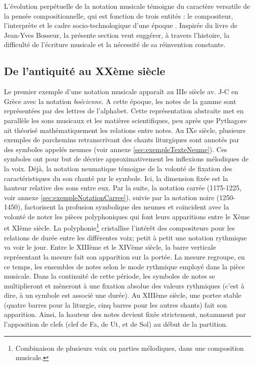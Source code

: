 L'évolution perpétuelle de la notation musicale témoigne du caractère versatile de la pensée compositionnelle, qui est fonction de trois entités : le compositeur, l'interprète et le cadre socio-technologique d'une époque \cite{bosseur2005}.
Inspirée du livre  de Jean-Yves Bosseur, la présente section %
veut suggérer, à travers l'histoire, la difficulté de l'écriture musicale et la nécessité de sa réinvention constante.


\subsection{De l'antiquité au XXème siècle}
\label{subsec:antiquiteAuXX}
Le premier exemple d'une notation musicale apparaît au IIIe siècle av. J-C en Grèce avec la notation \textit{boécienne}. A cette époque, les notes de la gamme sont représentées par des lettres de l'alphabet.
Cette représentation abstraite met en parallèle les sons musicaux et les matières scientifiques, peu après que Pythagore ait théorisé mathématiquement les relations entre notes.
Au IXe siècle, plusieurs exemples de parchemins retranscrivant des chants liturgiques sont annotés par des symboles appelés \glspl{neume} (voir annexe \ref{sec:exempleTexteNeume}). 
Ces symboles ont pour but de décrire approximativement les inflexions mélodiques de la voix.
Déjà, la notation neumatique témoigne de la volonté de fixation des caractéristiques du son chanté par le symbole. Ici, la dimension fixée est la hauteur relative des sons entre eux.
Par la suite, la notation carrée (1175-1225, voir annexe \ref{sec:exempleNotationCarree}), suivie par la notation noire (1250-1450), factorisent la profusion symbolique des neumes et coïncident avec la volonté de noter les pièces polyphoniques qui font leurs apparitions entre le Xème et XIème siècle.
La \gls{polyphonie}\footnote{Combinaison de plusieurs voix ou parties mélodiques, dans une composition musicale.} cristallise l'intérêt des compositeurs pour les relations de durée entre les différentes voix; petit à petit une notation rythmique va voir le jour.
Entre le XIIIème et le XIVème siècle, la barre verticale représentant la mesure fait son apparition sur la portée. La mesure regroupe, en ce temps, les ensembles de notes selon le mode rythmique employé dans la pièce musicale.
Dans la continuité de cette période, les symboles de notes se multiplieront et mèneront à une fixation absolue des valeurs rythmiques (c'est à dire, à un symbole est associé une durée).
Au XIIIème siècle, une \gls{portee} stable (quatre barres pour la liturgie, cinq barres pour les autres chants) fait son apparition. Ainsi, la hauteur des notes devient fixée strictement, notamment par l'apposition de \glspl{clef} (clef de Fa, de Ut, et de Sol) au début de la partition.

